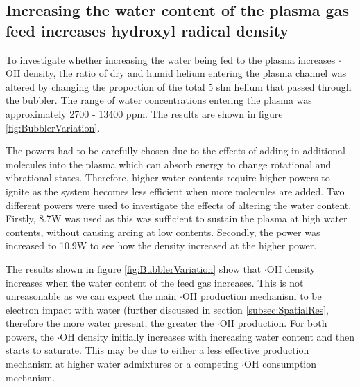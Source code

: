 \documentclass[11pt, oneside]{article}   	%
\begin{document}
\subsection{Increasing the water content of the plasma gas feed increases hydroxyl radical density}

To investigate whether increasing the water being fed to the plasma increases $\cdot$OH density, the ratio of dry and humid helium entering the plasma channel was altered by changing the proportion of the total 5 slm helium that passed through the bubbler. The range of water concentrations entering the plasma was approximately 2700 - 13400 ppm. The results are shown in figure \ref{fig:BubblerVariation}.

The powers had to be carefully chosen due to the effects of adding in additional molecules into the plasma which can absorb energy to change rotational and vibrational states. 
Therefore, higher water contents require higher powers to ignite as the system becomes less efficient when more molecules are added.
Two different powers were used to investigate the effects of altering the water content. Firstly, 8.7W was used as this was sufficient to sustain the plasma at high water contents, without causing arcing at low contents. Secondly, the power was increased to 10.9W to see how the density increased at the higher power. 

The results shown in figure \ref{fig:BubblerVariation} show that $\cdot$OH density increases when the water content of the feed gas increases. This is not unreasonable as we can expect the main $\cdot$OH production mechanism to be electron impact with water (further discussed in section \ref{subsec:SpatialRes}, therefore the more water present, the greater the $\cdot$OH production.
For both powers, the $\cdot$OH density initially increases with increasing water content and then starts to saturate.
This may be due to either a less effective production mechanism at higher water admixtures or a competing $\cdot$OH consumption mechanism.

\end{document}
